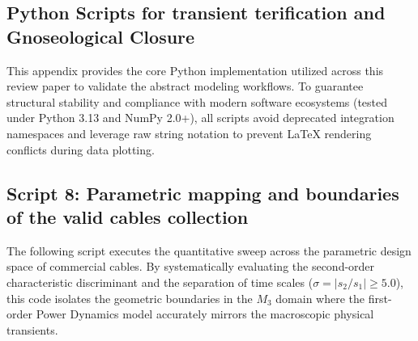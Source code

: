 \documentclass[11pt, a4paper]{article}
\begin{document}
\subsection*{Python Scripts for transient terification and Gnoseological Closure}
This appendix provides the core Python implementation utilized across this review paper to validate the abstract modeling workflows. To guarantee structural stability and compliance with modern software ecosystems (tested under Python 3.13 and NumPy 2.0+), all scripts avoid deprecated integration namespaces and leverage raw string notation to prevent LaTeX rendering conflicts during data plotting.


\subsection*{Script 8: Parametric mapping and boundaries of the valid cables collection} \label{app:script8}
The following script executes the quantitative sweep across the parametric design space of commercial cables. By systematically evaluating the second-order characteristic discriminant and the separation of time scales ($\sigma = |s_2 / s_1| \ge 5.0$), this code isolates the geometric boundaries in the $M_3$ domain where the first-order Power Dynamics model accurately mirrors the macroscopic physical transients.
\end{document}
